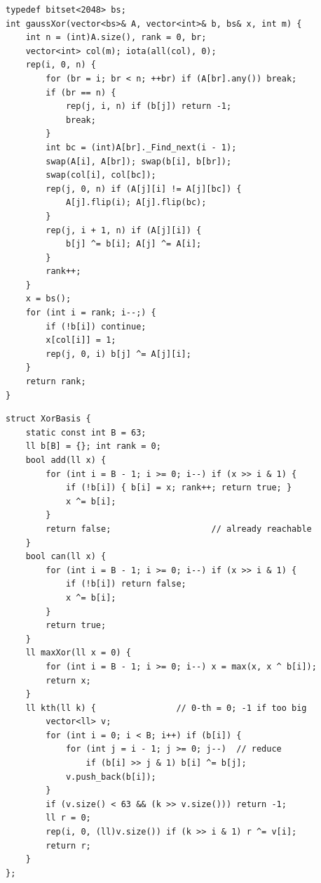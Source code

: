 \begin{lstlisting}
typedef bitset<2048> bs;
int gaussXor(vector<bs>& A, vector<int>& b, bs& x, int m) {
    int n = (int)A.size(), rank = 0, br;
    vector<int> col(m); iota(all(col), 0);
    rep(i, 0, n) {
        for (br = i; br < n; ++br) if (A[br].any()) break;
        if (br == n) {
            rep(j, i, n) if (b[j]) return -1;
            break;
        }
        int bc = (int)A[br]._Find_next(i - 1);
        swap(A[i], A[br]); swap(b[i], b[br]);
        swap(col[i], col[bc]);
        rep(j, 0, n) if (A[j][i] != A[j][bc]) {
            A[j].flip(i); A[j].flip(bc);
        }
        rep(j, i + 1, n) if (A[j][i]) {
            b[j] ^= b[i]; A[j] ^= A[i];
        }
        rank++;
    }
    x = bs();
    for (int i = rank; i--;) {
        if (!b[i]) continue;
        x[col[i]] = 1;
        rep(j, 0, i) b[j] ^= A[j][i];
    }
    return rank;
}
\end{lstlisting}


\begin{lstlisting}
struct XorBasis {
    static const int B = 63;
    ll b[B] = {}; int rank = 0;
    bool add(ll x) {
        for (int i = B - 1; i >= 0; i--) if (x >> i & 1) {
            if (!b[i]) { b[i] = x; rank++; return true; }
            x ^= b[i];
        }
        return false;                    // already reachable
    }
    bool can(ll x) {
        for (int i = B - 1; i >= 0; i--) if (x >> i & 1) {
            if (!b[i]) return false;
            x ^= b[i];
        }
        return true;
    }
    ll maxXor(ll x = 0) {
        for (int i = B - 1; i >= 0; i--) x = max(x, x ^ b[i]);
        return x;
    }
    ll kth(ll k) {                // 0-th = 0; -1 if too big
        vector<ll> v;
        for (int i = 0; i < B; i++) if (b[i]) {
            for (int j = i - 1; j >= 0; j--)  // reduce
                if (b[i] >> j & 1) b[i] ^= b[j];
            v.push_back(b[i]);
        }
        if (v.size() < 63 && (k >> v.size())) return -1;
        ll r = 0;
        rep(i, 0, (ll)v.size()) if (k >> i & 1) r ^= v[i];
        return r;
    }
};
\end{lstlisting}

